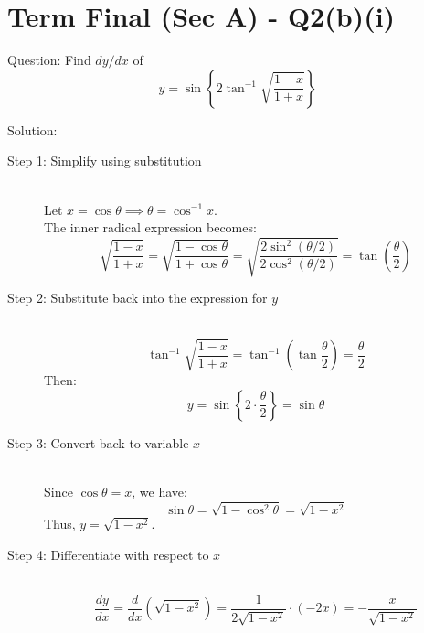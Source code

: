 \documentclass[11pt, a4paper]{article}
\begin{document}


\section*{Term Final (Sec A) - Q2(b)(i)}

Question:
Find $dy/dx$ of 
\[ y = \sin\left\{ 2\tan^{-1} \sqrt{\frac{1-x}{1+x}} \right\} \]

Solution:

\begin{description}
    \item[Step 1: Simplify using substitution] \ \\
    Let $x = \cos \theta \implies \theta = \cos^{-1} x$.\\
    The inner radical expression becomes:
    \[ \sqrt{\frac{1-x}{1+x}} = \sqrt{\frac{1-\cos\theta}{1+\cos\theta}} = \sqrt{\frac{2\sin^2(\theta/2)}{2\cos^2(\theta/2)}} = \tan\left(\frac{\theta}{2}\right) \]

    \item[Step 2: Substitute back into the expression for $y$] \ \\
    \[ \tan^{-1} \sqrt{\frac{1-x}{1+x}} = \tan^{-1}\left(\tan\frac{\theta}{2}\right) = \frac{\theta}{2} \]
    Then:
    \[ y = \sin\left\{ 2 \cdot \frac{\theta}{2} \right\} = \sin \theta \]

    \item[Step 3: Convert back to variable $x$] \ \\
    Since $\cos\theta = x$, we have:
    \[ \sin\theta = \sqrt{1 - \cos^2\theta} = \sqrt{1 - x^2} \]
    Thus, $y = \sqrt{1 - x^2}$.

    \item[Step 4: Differentiate with respect to $x$] \ \\
    \[ \frac{dy}{dx} = \frac{d}{dx}\left(\sqrt{1 - x^2}\right) = \frac{1}{2\sqrt{1-x^2}} \cdot (-2x) = -\frac{x}{\sqrt{1-x^2}} \]
\end{description}
\end{document}
